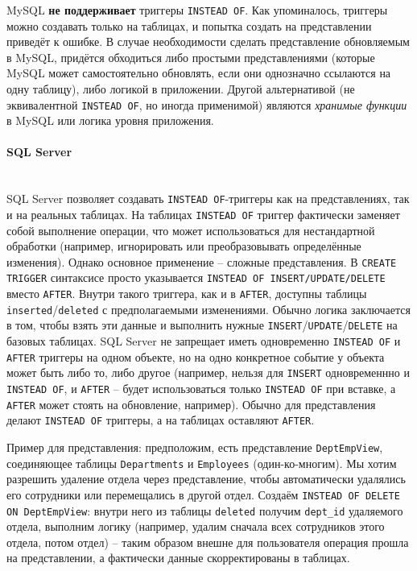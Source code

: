  MySQL \textbf{не поддерживает} триггеры \texttt{INSTEAD OF}. Как упоминалось, триггеры можно создавать только на таблицах, и попытка создать на представлении приведёт к ошибке. В случае необходимости сделать представление обновляемым в MySQL, придётся обходиться либо простыми представлениями (которые MySQL может самостоятельно обновлять, если они однозначно ссылаются на одну таблицу), либо логикой в приложении. Другой альтернативой (не эквивалентной \texttt{INSTEAD OF}, но иногда применимой) являются \textit{хранимые функции} в MySQL или логика уровня приложения.

\paragraph{\textbf{SQL Server}} ~\\

 SQL Server позволяет создавать \texttt{INSTEAD OF}-триггеры как на представлениях, так и на реальных таблицах. На таблицах \texttt{INSTEAD OF} триггер фактически заменяет собой выполнение операции, что может использоваться для нестандартной обработки (например, игнорировать или преобразовывать определённые изменения). Однако основное применение – сложные представления. В \texttt{CREATE TRIGGER} синтаксисе просто указывается \texttt{INSTEAD OF INSERT/UPDATE/DELETE} вместо \texttt{AFTER}. Внутри такого триггера, как и в \texttt{AFTER}, доступны таблицы \texttt{inserted}/\texttt{deleted} с предполагаемыми изменениями. Обычно логика заключается в том, чтобы взять эти данные и выполнить нужные \texttt{INSERT}/\texttt{UPDATE}/\texttt{DELETE} на базовых таблицах. SQL Server не запрещает иметь одновременно \texttt{INSTEAD OF} и \texttt{AFTER} триггеры на одном объекте, но на одно конкретное событие у объекта может быть либо то, либо другое (например, нельзя для \texttt{INSERT} одновременнно и \texttt{INSTEAD OF}, и \texttt{AFTER} – будет использоваться только \texttt{INSTEAD OF} при вставке, а \texttt{AFTER} может стоять на обновление, например). Обычно для представления делают \texttt{INSTEAD OF} триггеры, а на таблицах оставляют \texttt{AFTER}.
 
 Пример для представления: предположим, есть представление \texttt{DeptEmpView}, соединяющее таблицы \texttt{Departments} и \texttt{Employees} (один-ко-многим). Мы хотим разрешить удаление отдела через представление, чтобы автоматически удалялись его сотрудники или перемещались в другой отдел. Создаём \texttt{INSTEAD OF DELETE ON DeptEmpView}: внутри него из таблицы \texttt{deleted} получим \texttt{dept\_id} удаляемого отдела, выполним логику (например, удалим сначала всех сотрудников этого отдела, потом отдел) – таким образом внешне для пользователя операция прошла на представлении, а фактически данные скорректированы в таблицах.

